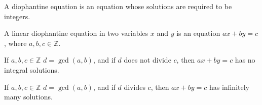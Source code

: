 \documentclass[crop=false,class=book,oneside]{standalone}
\begin{document}
             \begin{definition}
                A diophantine equation is an equation whose
                solutions are required to be integers.
             \end{definition}
             \begin{definition}
                A linear diophantine equation in two variables
                $x$ and $y$ is an equation
                $ax+by=c$, where $a,b,c\in\mathbb{Z}$.
             \end{definition}
             \begin{theorem*}
                If $a,b,c\in\mathbb{Z}$ $d=\gcd(a,b)$,
                and if $d$ does not divide $c$,
                then $ax+by=c$ has no integral solutions.
             \end{theorem*}
             \begin{theorem*}
                If $a,b,c\in\mathbb{Z}$ $d=\gcd(a,b)$,
                and if $d$ divides $c$,
                then $ax+by=c$ has infinitely many solutions.
             \end{theorem*}
\end{document}

